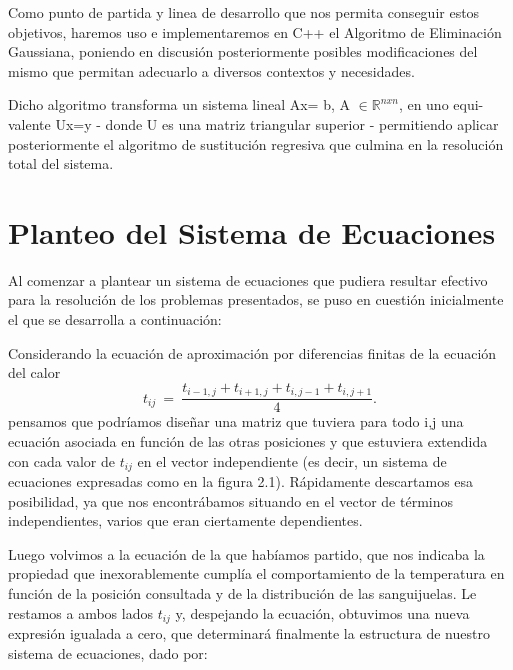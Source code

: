 \documentclass[double, 1.5in, 12pt]{beavtex}
\begin{document}
Como punto de partida y linea de desarrollo que nos permita conseguir estos objetivos, haremos uso e implementaremos en C++ el Algoritmo de Eliminaci\'on Gaussiana, poniendo en discusi\'on posteriormente posibles modificaciones del mismo que permitan adecuarlo a diversos contextos y necesidades.

Dicho algoritmo transforma un sistema lineal Ax= b, A $\in \mathbb{R}^{nxn}$, en uno equi- \- valente Ux=y - donde U es una matriz triangular superior - permitiendo aplicar posteriormente el algoritmo de sustituci\'on regresiva que culmina en la resoluci\'on total del sistema.









\section{Planteo del Sistema de Ecuaciones}

Al  comenzar a plantear un sistema de ecuaciones que pudiera resultar efectivo para la resoluci\'on de los problemas presentados, se puso en cuesti\'on inicialmente el que se desarrolla a continuaci\'on:

Considerando la ecuaci\'on de aproximaci\'on por diferencias finitas de la ecuaci\'on del calor
\begin{equation}
t_{ij} \ =\ \frac{ t_{i-1,j} + t_{i+1,j} + t_{i,j-1} + t_{i,j+1}}{4}.\label{eq:calordd}
\end{equation}
pensamos que podr\'iamos diseñar una matriz que tuviera para todo i,j una ecuaci\'on asociada en funci\'on de las otras posiciones y que estuviera extendida con cada valor de $t_{ij}$ en el vector independiente (es decir, un sistema de ecuaciones expresadas como en la figura 2.1). R\'apidamente descartamos esa posibilidad, ya que nos encontr\'abamos situando en el vector de t\'erminos independientes, varios que eran ciertamente dependientes.

Luego volvimos a la ecuaci\'on de la que hab\'iamos partido, que nos indicaba la propiedad que inexorablemente cumpl\'ia el comportamiento de la temperatura en funci\'on de la posici\'on consultada  y de la distribuci\'on de las sanguijuelas.  Le restamos a ambos lados $t_{ij}$ y, despejando la ecuaci\'on, obtuvimos una nueva expresi\'on igualada a cero, que determinar\'a finalmente la estructura de nuestro sistema de ecuaciones, dado por:
\end{document}
